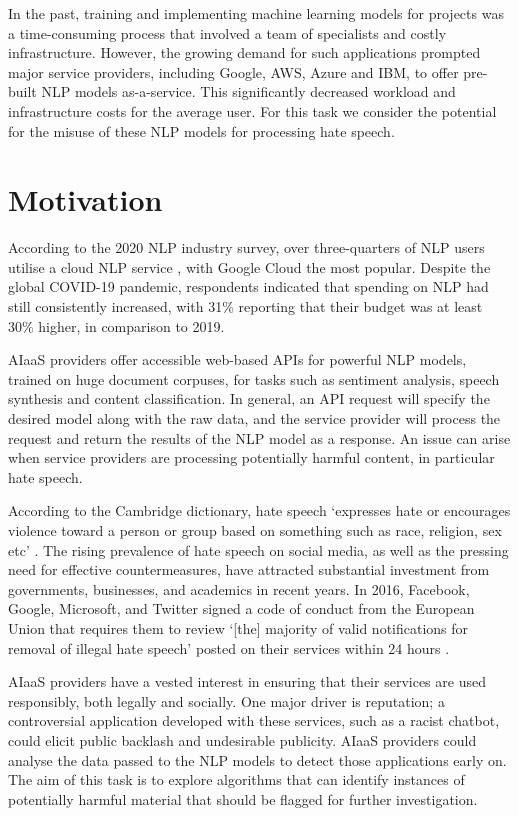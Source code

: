 \documentclass[a4paper,12pt]{report}
\begin{document}
	In the past, training and implementing machine learning models for projects was a time-consuming process that involved a team of specialists and costly infrastructure. However, the growing demand for such applications prompted major service providers, including Google, AWS, Azure and IBM, to offer pre-built NLP models as-a-service. This significantly decreased workload and infrastructure costs for the average user. For this task we consider the potential for the misuse of these NLP models for processing hate speech.
	
	\section{Motivation}
	According to the 2020 NLP industry survey, over three-quarters of NLP users utilise a cloud NLP service \cite{2020NLPS66:online}, with Google Cloud the most popular. Despite the global COVID-19 pandemic, respondents indicated that spending on NLP had still consistently increased, with 31\% reporting that their budget was at least 30\% higher, in comparison to 2019. 
	
	AIaaS providers offer accessible web-based APIs for powerful NLP models, trained on huge document corpuses, for tasks such as sentiment analysis, speech synthesis and content classification. In general, an API request will specify the desired model along with the raw data, and the service provider will process the request and return the results of the NLP model as a response. An issue can arise when service providers are processing potentially harmful content, in particular hate speech.
	
	According to the Cambridge dictionary, hate speech ‘expresses hate or encourages violence toward a person or group based on something such as race, religion, sex etc’ \cite{HATESPEE16:online}. The rising prevalence of hate speech on social media, as well as the pressing need for effective countermeasures, have attracted substantial investment from governments, businesses, and academics in recent years. In 2016, Facebook, Google, Microsoft, and Twitter signed a code of conduct from the European Union that requires them to review ‘[the] majority of valid notifications for removal of illegal hate speech’ posted on their services within 24 hours \cite{hern2016facebook}.
	
	AIaaS providers have a vested interest in ensuring that their services are used responsibly, both legally and socially. One major driver is reputation; a controversial application developed with these services, such as a racist chatbot, could elicit public backlash and undesirable publicity. AIaaS providers could analyse the data passed to the NLP models to detect those applications early on. The aim of this task is to explore algorithms that can identify instances of potentially harmful material that should be flagged for further investigation.
	
\end{document}
